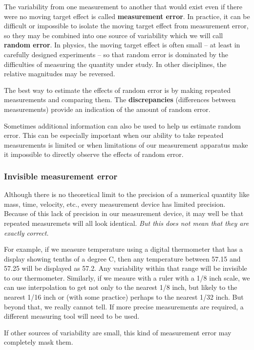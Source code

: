 \documentclass[twoside]{book}\usepackage[]{graphicx}\usepackage[]{xcolor}
\def\term#1{\textbf{#1}}
\newcounter{example}[section]
\begin{document}
The variability from one measurement to another that would exist even if there
were no moving target effect is called \term{measurement error}.  In practice,
it can be difficult or impossible to isolate the moving target effect from
measurement error, so they may be combined into one source of variability which
we will call 
\term{random error}.
In physics, the moving target effect is often small -- at least in carefully
designed experiments -- so that random error is dominated by the 
difficulties of measuring the quantity under study.  In other disciplines,
the relative magnitudes may be reversed.

The best way to estimate the effects of random error is by making repeated
measurements and comparing them.  The \term{discrepancies} (differences between
measurements) provide an indication of the amount of random error.  

Sometimes
additional information can also be used to help us estimate random error.  This
can be especially important when our ability to take repeated measurements is
limited or when limitations of our measurement apparatus make it impossible
to directly observe the effects of random error.

\subsubsection{Invisible measurement error}
Although there is no theoretical limit to the precision of a numerical quantity 
like mass, time, velocity, etc., every measurement device has limited precision.
Because of this lack of precision in our measurement device, it may well be 
that repeated measuremets will all look identical.  
\emph{But this does not mean that they are exactly correct.}  

For example,
if we measure temperature using a digital thermometer that has a display
showing tenths of a degree C, then any temperature between 57.15 and 57.25 will
be displayed as 57.2.  Any variability within that range will be invisible to
our thermometer.
Similarly, if we meaure with a ruler with a 1/8 inch scale, we can
use interpolation to get not only to the nearest 1/8 inch, but likely to the 
nearest 1/16 inch or (with some practice) perhaps to the nearest 1/32 inch.  But
beyond that, we really cannot tell.  If more precise measurements are required,
a different measuring tool will need to be used.

If other sources of variability are small, this kind of measurement error 
may completely mask them.
\end{document}

